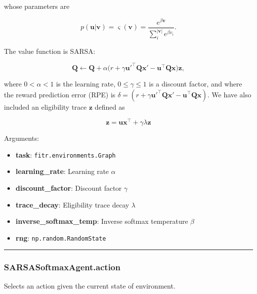 whose parameters are

\[
p(\mathbf u|\mathbf v) = \varsigma(\mathbf v) = \frac{e^{\beta \mathbf v}}{\sum_{i}^{|\mathbf v|} e^{\beta v_i}}.
\]

The value function is SARSA:

\[
\mathbf Q \gets \mathbf Q + \alpha \big(r + \gamma \mathbf u'^\top \mathbf Q \mathbf x' - \mathbf u^\top \mathbf Q \mathbf x \big) \mathbf z,
\]

where \(0 < \alpha < 1\) is the learning rate, \(0 \leq \gamma \leq 1\)
is a discount factor, and where the reward prediction error (RPE) is
\(\delta = (r + \gamma \mathbf u'^\top \mathbf Q \mathbf x' - \mathbf u^\top \mathbf Q \mathbf x)\).
We have also included an eligibility trace \(\mathbf z\) defined as

\[
\mathbf z = \mathbf u \mathbf x^\top +  \gamma \lambda \mathbf z
\]

Arguments:

\begin{itemize}
\tightlist
\item
  \textbf{task}: \texttt{fitr.environments.Graph}
\item
  \textbf{learning\_rate}: Learning rate \(\alpha\)
\item
  \textbf{discount\_factor}: Discount factor \(\gamma\)
\item
  \textbf{trace\_decay}: Eligibility trace decay \(\lambda\)
\item
  \textbf{inverse\_softmax\_temp}: Inverse softmax temperature \(\beta\)
\item
  \textbf{rng}: \texttt{np.random.RandomState}
\end{itemize}

\begin{center}\rule{0.5\linewidth}{\linethickness}\end{center}

\subsubsection{SARSASoftmaxAgent.action}\label{sarsasoftmaxagent.action}

\begin{Shaded}
\begin{Highlighting}[]
\end{Highlighting}
\end{Shaded}

Selects an action given the current state of environment.

